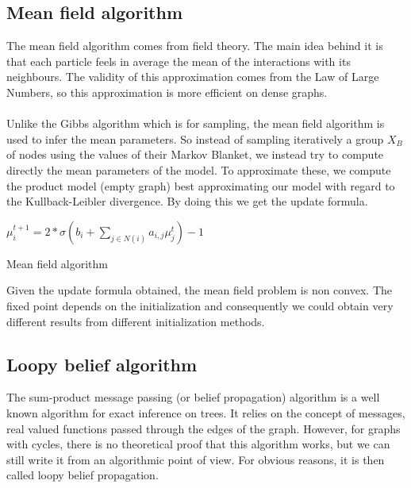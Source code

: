 \documentclass[a4paper]{article}
\begin{document}
\subsection{Mean field algorithm}
    The mean field algorithm comes from field theory. The main idea behind it is that each particle feels in average the mean of the interactions with its neighbours. The validity of this approximation comes from the Law of Large Numbers, so this approximation is more efficient on dense graphs.
    
    \paragraph{}
    
    Unlike the Gibbs algorithm which is for sampling, the mean field algorithm is used to infer the mean parameters. So instead of sampling iteratively a group $X_B$ of nodes using the values of their Markov Blanket, we instead try to compute directly the mean parameters of the model. To approximate these, we compute the product model (empty graph) best approximating our model with regard to the Kullback-Leibler divergence. By doing this we get the update formula.
        \begin{algorithm}
         {
            {
            $\mu_i^{t+1} = 2*\sigma( b_i + \sum\limits_{j \in N(i)} a_{i,j}\mu_j^t ) - 1 $
            }
        }
	
        \caption{Mean field algorithm}
        \label{algo:meanfield}
    \end{algorithm}
    
    Given the update formula obtained, the mean field problem is non convex. The fixed point depends on the initialization and consequently we could obtain very different results from different initialization methods.

\subsection{Loopy belief algorithm}
    The sum-product message passing (or belief propagation) algorithm is a well known algorithm for exact inference on trees. It relies on the concept of messages, real valued functions passed through the edges of the graph. However, for graphs with cycles, there is no theoretical proof that this algorithm works, but we can still write it from an algorithmic point of view. For obvious reasons, it is then called loopy belief propagation.
    
\end{document}
